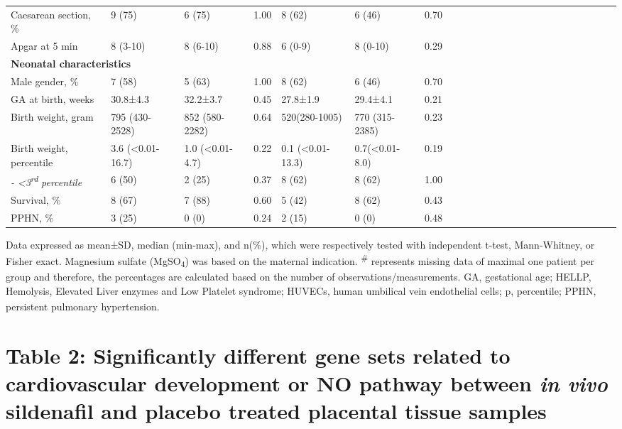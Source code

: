 \documentclass[authordate, empirical]{jote-new-article}
\begin{document}
\begin{table}
\begin{tabularx}{\linewidth}{@{} l l l l l l l l l l l l l l l l l l l l l l l l @{}}
			 Caesarean section, \% & 9 (75) & 6 (75) & 1.00 & 8 (62) & 6 (46) & 0.70 \\

			 Apgar at 5 min & 8 (3-10) & 8 (6-10) & 0.88 & 6 (0-9) & 8 (0-10) & 0.29 \\

			 \multicolumn{7}{l}{\textbf{Neonatal characteristics}} \\

			 Male gender, \% & 7 (58) & 5 (63) & 1.00 & 8 (62) & 6 (46) & 0.70 \\

			 GA at birth, weeks & 30.8±4.3 & 32.2±3.7 & 0.45 & 27.8±1.9 & 29.4±4.1 & 0.21
			\\

			 Birth weight, gram & 795 (430-2528) & 852 (580-2282) & 0.64 & 520(280-1005)
			& 770 (315-2385) & 0.23 \\

			 Birth weight, percentile & 3.6 (<0.01-16.7) & 1.0 (<0.01-4.7) & 0.22 & 0.1 (<0.01-13.3)
			& 0.7(<0.01-8.0) & 0.19 \\

			 \emph{ - <3}\textsuperscript{\emph{rd}}\emph{ percentile} & 6 (50) & 2 (25)
			& 0.37 & 8 (62) & 8 (62) & 1.00 \\

			 Survival, \% & 8 (67) & 7 (88) & 0.60 & 5 (42) & 8 (62) & 0.43 \\

			 PPHN, \% & 3 (25) & 0 (0) & 0.24 & 2 (15) & 0 (0) & 0.48 \\


		\end{tabularx}
	\end{table}

	Data expressed as mean±SD, median (min-max), and n(\%), which were respectively tested with independent t-test, Mann-Whitney, or Fisher exact. Magnesium sulfate (MgSO\textsubscript{4}) was based on the maternal indication. \textsuperscript{\# }represents missing data of maximal one patient per group and therefore, the percentages are calculated based on the number of observations/measurements. GA, gestational age; HELLP, Hemolysis, Elevated Liver enzymes and Low Platelet syndrome; HUVECs, human umbilical vein endothelial cells;\textsubscript{ }p, percentile; PPHN, persistent pulmonary hypertension.







	\section{\textbf{Table 2: Significantly different gene sets related to cardiovascular development or NO pathway between }\emph{\textbf{in vivo }}\textbf{sildenafil and placebo treated placental tissue samples}}
\end{document}

